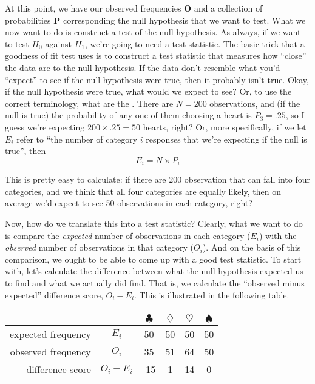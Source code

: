 At this point, we have our observed frequencies $\bm{O}$ and a collection of probabilities $\bm{P}$ corresponding the null hypothesis that we want to test. What we now want to do is construct a test of the null hypothesis. As always, if we want to test $H_0$ against $H_1$, we're going to need a test statistic. The basic trick that a goodness of fit test uses is to construct a test statistic that measures how ``close'' the data are to the null hypothesis. If the data don't resemble what you'd ``expect'' to see if the null hypothesis were true, then it probably isn't true. Okay, if the null hypothesis were true, what would we expect to see? Or, to use the correct terminology, what are the . There are $N=200$ observations, and (if the null is true) the probability of any one of them choosing a heart is $P_3 = .25$, so I guess we're expecting $200 \times .25 = 50$ hearts, right? Or, more specifically, if we let $E_i$ refer  to ``the number of category $i$ responses that we're expecting if the null is true'', then
$$
E_i = N \times P_i
$$

This is pretty easy to calculate: if there are 200 observation that can fall into four categories, and we think that all four categories are equally likely, then on average we'd expect to see 50 observations in each category, right?

Now, how do we translate this into a test statistic? Clearly, what we want to do is compare the {\it expected} number of observations in each category ($E_i$) with the {\it observed} number of observations in that category ($O_i$). And on the basis of this comparison, we ought to be able to come up with a good test statistic. To start with, let's calculate the difference between what the null hypothesis expected us to find and what we actually did find. That is, we calculate the ``observed minus expected'' difference score, $O_i - E_i$. This is illustrated in the following table. 

\begin{center}
\begin{tabular}{rc|cccc}
& & $\clubsuit$ & $\diamondsuit$ & $\heartsuit$ & $\spadesuit$ \\ \hline 
expected frequency &$E_i$ & 50 & 50 & 50 & 50 \\ 
observed frequency &$O_i$ & 35 & 51 & 64 & 50 \\ 
difference score & $O_i - E_i$ & -15 & 1 & 14 & 0 \\
\end{tabular}
\end{center}

